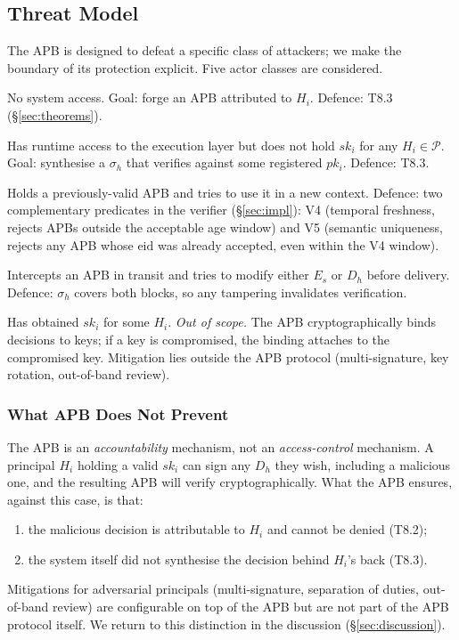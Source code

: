 \documentclass[11pt]{article}
\newcommand{\Pset}{\mathcal{P}}
\newcommand{\Es}{E_s}
\newcommand{\Dh}{D_h}
\newcommand{\sigh}{\sigma_h}
\newcommand{\Hi}{H_i}
\newcommand{\ski}{sk_i}
\newcommand{\pki}{pk_i}
\begin{document}
\subsection{Threat Model}
\label{sec:threat}

The APB is designed to defeat a specific class of attackers; we make
the boundary of its protection explicit. Five actor classes are
considered.

\begin{description}[leftmargin=2em, topsep=2pt]
  \item[A1. External attacker.] No system access. Goal: forge an APB
        attributed to $\Hi$. Defence: T8.3 (\S\ref{sec:theorems}).
  \item[A2. Compromised system process.] Has runtime access to the
        execution layer but does not hold $\ski$ for any
        $\Hi \in \Pset$. Goal: synthesise a $\sigh$ that verifies
        against some registered $\pki$. Defence: T8.3.
  \item[A3. Replay attacker.] Holds a previously-valid APB and tries
        to use it in a new context. Defence: two complementary predicates
        in the verifier (\S\ref{sec:impl}): V4 (temporal freshness, rejects
        APBs outside the acceptable age window) and V5 (semantic
        uniqueness, rejects any APB whose $\mathrm{eid}$ was already
        accepted, even within the V4 window).
  \item[A4. Man-in-the-middle.] Intercepts an APB in transit and tries
        to modify either $\Es$ or $\Dh$ before delivery. Defence:
        $\sigh$ covers both blocks, so any tampering invalidates
        verification.
  \item[A5. Compromised principal.] Has obtained $\ski$ for some
        $\Hi$. \emph{Out of scope.} The APB cryptographically binds
        decisions to keys; if a key is compromised, the binding
        attaches to the compromised key. Mitigation lies outside
        the APB protocol (multi-signature, key rotation,
        out-of-band review).
\end{description}

\subsubsection{What APB Does Not Prevent}
The APB is an \emph{accountability} mechanism, not an
\emph{access-control} mechanism. A principal $\Hi$ holding a valid
$\ski$ can sign any $\Dh$ they wish, including a malicious one, and
the resulting APB will verify cryptographically. What the APB
ensures, against this case, is that:
\begin{enumerate}[leftmargin=2em, topsep=2pt, itemsep=1pt]
  \item the malicious decision is attributable to $\Hi$ and cannot
        be denied (T8.2);
  \item the system itself did not synthesise the decision behind
        $\Hi$'s back (T8.3).
\end{enumerate}
Mitigations for adversarial principals (multi-signature, separation
of duties, out-of-band review) are configurable on top of the APB
but are not part of the APB protocol itself. We return to this
distinction in the discussion (\S\ref{sec:discussion}).
\end{document}
